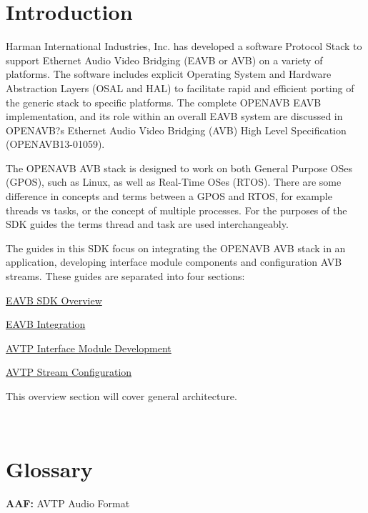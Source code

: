 \hypertarget{sdk_overview_sdk_overview_introduction}{}\section{Introduction }\label{sdk_overview_sdk_overview_introduction}
Harman International Industries, Inc. has developed a software Protocol Stack to support Ethernet Audio Video Bridging (E\+A\+VB or A\+VB) on a variety of platforms. The software includes explicit Operating System and Hardware Abstraction Layers (O\+S\+AL and H\+AL) to facilitate rapid and efficient porting of the generic stack to specific platforms. The complete O\+P\+E\+N\+A\+VB E\+A\+VB implementation, and its role within an overall E\+A\+VB system are discussed in O\+P\+E\+N\+A\+VB?s Ethernet Audio Video Bridging (A\+VB) High Level Specification (O\+P\+E\+N\+A\+V\+B13-\/01059).

The O\+P\+E\+N\+A\+VB A\+VB stack is designed to work on both General Purpose O\+Ses (G\+P\+OS), such as Linux, as well as Real-\/\+Time O\+Ses (R\+T\+OS). There are some difference in concepts and terms between a G\+P\+OS and R\+T\+OS, for example threads vs tasks, or the concept of multiple processes. For the purposes of the S\+DK guides the terms thread and task are used interchangeably.

The guides in this S\+DK focus on integrating the O\+P\+E\+N\+A\+VB A\+VB stack in an application, developing interface module components and configuration A\+VB streams. These guides are separated into four sections\+:


\begin{DoxyItemize}
\item \hyperlink{sdk_overview}{E\+A\+VB S\+DK Overview}
\item \hyperlink{sdk_integration}{E\+A\+VB Integration}
\item \hyperlink{sdk_avtp_interface_module_dev}{A\+V\+TP Interface Module Development}
\item \hyperlink{sdk_avtp_stream_cfg}{A\+V\+TP Stream Configuration}
\end{DoxyItemize}

This overview section will cover general architecture.

~\newline
\hypertarget{sdk_overview_sdk_overview_glossary}{}\section{Glossary }\label{sdk_overview_sdk_overview_glossary}
{\bfseries A\+AF\+:} A\+V\+TP Audio Format

